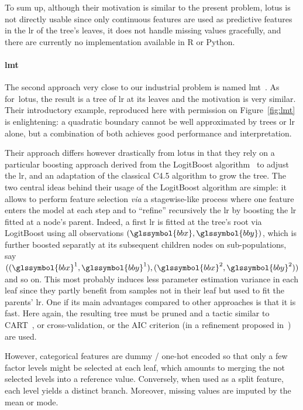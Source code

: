 To sum up, although their motivation is similar to the present problem, \gls{lotus} is not directly usable since only continuous features are used as predictive features in the \gls{lr} of the tree's leaves, it does not handle missing values gracefully, and there are currently no implementation available in \textsf{R} or Python.

\paragraph{\gls{lmt}}

The second approach very close to our industrial problem is named \gls{lmt}~\cite{landwehr2005logistic}. As for~\gls{lotus}, the result is a tree of \gls{lr} at its leaves and the motivation is very similar. Their introductory example, reproduced here with permission on Figure~\ref{fig:lmt} is enlightening: a quadratic boundary cannot be well approximated by trees or \gls{lr} alone, but a combination of both achieves good performance and interpretation.

Their approach differs however drastically from \gls{lotus} in that they rely on a particular boosting approach derived from the LogitBoost algorithm~\cite{friedman2000additive} to adjust the \gls{lr}, and an adaptation of the classical C4.5 algorithm to grow the tree. The two central ideas behind their usage of the LogitBoost algorithm are simple: it allows to perform feature selection \textit{via} a stagewise-like process where one feature enters the model at each step and to ``refine'' recursively the \gls{lr} by boosting the \gls{lr} fitted at a node's parent. Indeed, a first \gls{lr} is fitted at the tree's root via LogitBoost using all observations $(\glssymbol{bbx},\glssymbol{bby})$, which is further boosted separatly at its subsequent children nodes on sub-populations, say $((\glssymbol{bbx}^1,\glssymbol{bby}^1), (\glssymbol{bbx}^2,\glssymbol{bby}^2))$ and so on. This most probably induces less parameter estimation variance in each leaf since they partly benefit from samples not in their leaf but used to fit the parents' \gls{lr}. One if its main advantages compared to other approaches is that it is fast. Here again, the resulting tree must be pruned and a tactic similar to CART~\cite{cart84}, or cross-validation, or the AIC criterion (in a refinement proposed in~\cite{sumner2005speeding}) are used.

However, categorical features are dummy / one-hot encoded so that only a few factor levels might be selected at each leaf, which amounts to merging the not selected levels into a reference value. Conversely, when used as a split feature, each level yields a distinct branch. Moreover, missing values are imputed by the mean or mode.


